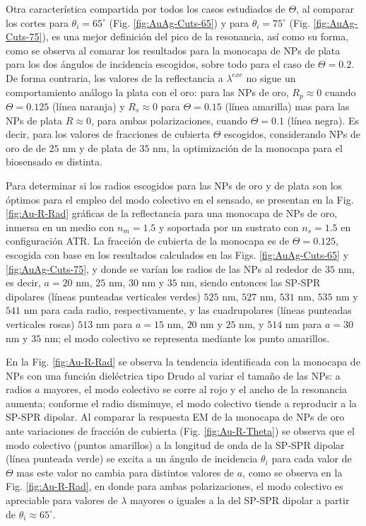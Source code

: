 Otra característica compartida por todos los casos estudiados de $\Theta$, al comparar los cortes para $\theta_i=65^\circ$ (Fig. \ref{fig:AuAg-Cuts-65}) y para $\theta_i=75^\circ$ (Fig. \ref{fig:AuAg-Cuts-75}), es una mejor definición del pico de la resonancia, así como su forma, como se observa al comarar los resultados para la monocapa de NPs de plata para los dos ángulos de incidencia escogidos, sobre todo para el caso de $\Theta=0.2$. De forma contraria, los valores de la reflectancia a $\lambda^{exc}$ no sigue un comportamiento análogo la plata con el oro: para las NPs de oro, $R_p\approx 0$ cuando $\Theta=0.125$ (línea naranja) y $R_s\approx 0$ para $\Theta=0.15$ (línea amarilla) mas para las NPs de plata $R\approx 0$, para ambas polarizaciones, cuando $\Theta=0.1$ (línea negra). Es decir, para los valores de fracciones de cubierta $\Theta$ escogidos, considerando NPs de oro de de $25$ nm y de plata de $35$ nm, la optimización de la monocapa para el biosensado es distinta.

Para determinar si los radios escogidos para las NPs de oro y de plata son los óptimos para el empleo del modo colectivo en el sensado, se presentan en la Fig. \ref{fig:Au-R-Rad}	gráficas de la reflectancia para una monocapa de NPs de oro, inmersa en un medio con $n_m=1.5$ y soportada por un sustrato con $n_s=1.5$ en configuración ATR. La fracción de cubierta de la monocapa es de $\Theta=0.125$, escogida con base en los resultados calculados en las Figs. \ref{fig:AuAg-Cuts-65} y \ref{fig:AuAg-Cuts-75}, y donde se varían los radios de las NPs al rededor de $35$ nm, es decir, $a=20$ nm, $25$ nm, $30$ nm y $35$ nm, siendo entonces las SP-SPR dipolares (líneas punteadas verticales verdes) $525$ nm, $527$ nm, $531$ nm, $535$ nm y $541$ nm para cada radio, respectivamente, y las cuadrupolares (líneas punteadas verticales rosas) $513$ nm para $a=15$ nm, $20$ nm y $25$ nm, y $514$ nm para $a=30$ nm y $35$ nm; el modo colectivo se representa mediante los punto amarillos.



En la Fig. \ref{fig:Au-R-Rad} se observa la tendencia identificada con la monocapa de NPs con una función dieléctrica tipo Drudo al variar el tamaño de las NPs: a radios $a$ mayores, el modo colectivo se corre al rojo y el ancho de la resonancia aumenta; conforme el radio disminuye, el modo colectivo tiende a reproducir a la SP-SPR dipolar. Al comparar la respuesta EM de la monocapa de NPs de oro ante variaciones de fracción de cubierta (Fig. \ref{fig:Au-R-Theta})  se observa que el modo colectivo (puntos amarillos) a la longitud de onda de la SP-SPR dipolar (línea punteada verde) se excita a un ángulo de incidencia $\theta_i$ para cada valor de $\Theta$ mas este valor no cambia para distintos valores de $a$, como se observa en la Fig. \ref{fig:Au-R-Rad}, en donde para ambas polarizaciones, el modo colectivo es apreciable para valores de $\lambda$ mayores o iguales a la del SP-SPR dipolar a partir de $\theta_i\approx 65^\circ$.

